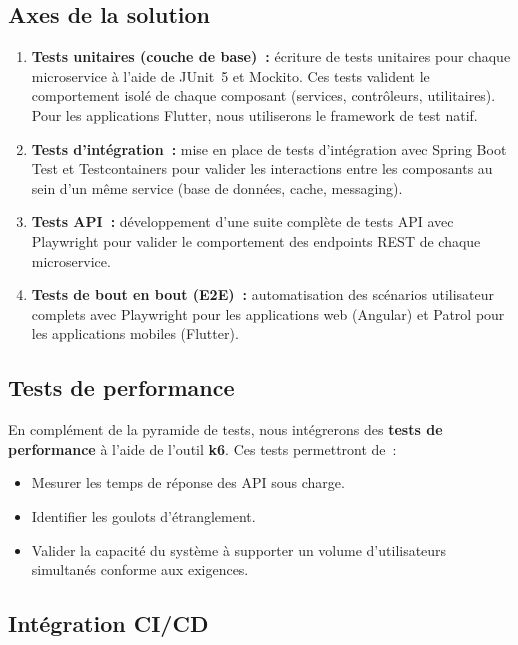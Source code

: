 \subsection{Axes de la solution}
\label{subsec:axes-solution}

\begin{enumerate}
    \item \textbf{Tests unitaires (couche de base)~:} écriture de tests unitaires pour chaque microservice à l'aide de JUnit~5 et Mockito. Ces tests valident le comportement isolé de chaque composant (services, contrôleurs, utilitaires). Pour les applications Flutter, nous utiliserons le framework de test natif.

    \item \textbf{Tests d'intégration~:} mise en place de tests d'intégration avec Spring Boot Test et Testcontainers pour valider les interactions entre les composants au sein d'un même service (base de données, cache, messaging).

    \item \textbf{Tests API~:} développement d'une suite complète de tests API avec Playwright pour valider le comportement des endpoints REST de chaque microservice.

    \item \textbf{Tests de bout en bout (E2E)~:} automatisation des scénarios utilisateur complets avec Playwright pour les applications web (Angular) et Patrol pour les applications mobiles (Flutter).
\end{enumerate}

\subsection{Tests de performance}
\label{subsec:tests-performance}

En complément de la pyramide de tests, nous intégrerons des \textbf{tests de performance} à l'aide de l'outil \textbf{k6}. Ces tests permettront de~:

\begin{itemize}
    \item Mesurer les temps de réponse des API sous charge.
    \item Identifier les goulots d'étranglement.
    \item Valider la capacité du système à supporter un volume d'utilisateurs simultanés conforme aux exigences.
\end{itemize}

\subsection{Intégration CI/CD}
\label{subsec:integration-cicd-solution}

